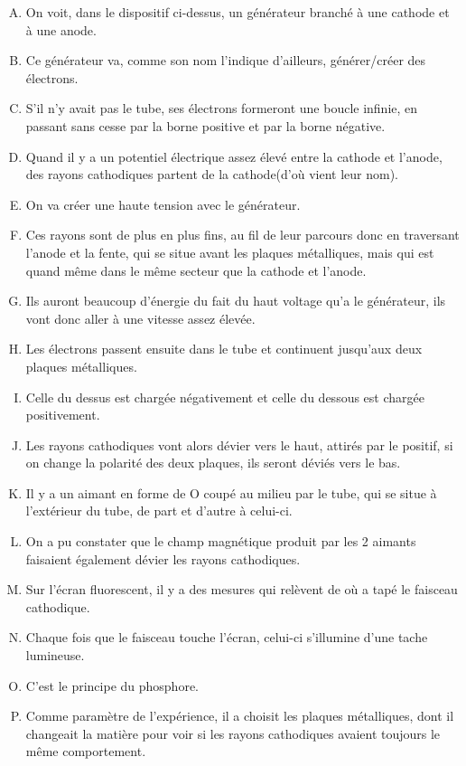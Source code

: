 \documentclass[../main.tex]{subfiles}
\begin{document}
\begin{enumerate}[I]
    \begin{enumerate}[A. ]
        \item On voit, dans le dispositif ci-dessus, un générateur branché à une cathode et à une anode.
        \item Ce générateur va, comme son nom l'indique d'ailleurs, générer/créer des électrons.
        \item S'il n'y avait pas le tube, ses électrons formeront une boucle infinie, en passant sans cesse par la borne positive et par la borne négative. 
         \item Quand il y a un potentiel électrique assez élevé entre la cathode et l'anode, des rayons cathodiques partent de la cathode(d'où vient leur nom).
         \item On va créer une haute tension avec le générateur.
        \item Ces rayons sont de plus en plus fins, au fil de leur parcours donc en traversant l'anode et la fente, qui se situe avant les plaques métalliques, mais qui est quand même dans le même secteur que la cathode et l'anode.
        \item Ils auront beaucoup d'énergie du fait du haut voltage qu'a le générateur, ils vont donc aller à une vitesse assez élevée.
        \item Les électrons passent ensuite dans le tube et continuent jusqu'aux deux plaques métalliques.
        \item Celle du dessus est chargée négativement et celle du dessous est chargée positivement.
        \item Les rayons cathodiques vont alors dévier vers le haut, attirés par le positif, si on change la polarité des deux plaques, ils seront déviés vers le bas.
        \item Il y a un aimant en forme de O coupé au milieu par le tube, qui se situe à l'extérieur du tube, de part et d'autre à celui-ci.
        \item On a pu constater que le champ magnétique produit par les 2 aimants faisaient également dévier les rayons cathodiques.
        \item Sur l'écran fluorescent, il y a des mesures qui relèvent de où a tapé le faisceau cathodique. 
        \item Chaque fois que le faisceau touche l'écran, celui-ci s'illumine d'une tache lumineuse.
        \item C'est le principe du phosphore.
        \item Comme paramètre de l'expérience, il a choisit les plaques métalliques, dont il changeait la matière pour voir si les rayons cathodiques avaient toujours le même comportement.

\end{enumerate}
\end{enumerate}
\end{document}
